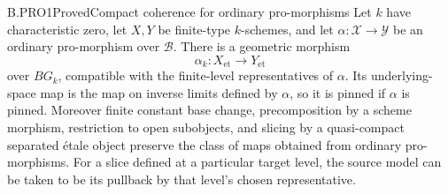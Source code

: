 \begin{claim}{B.PRO1}{Proved}{Compact coherence for ordinary pro-morphisms}
Let \(k\) have characteristic zero, let \(X,Y\) be finite-type
\(k\)-schemes, and let
\(\alpha:\mathcal X\to\mathcal Y\) be an ordinary pro-morphism
over \(\mathcal B\). There is a geometric morphism
\[
                 \alpha_k:X_{\mathrm{et}}\longrightarrow
                           Y_{\mathrm{et}}                 \tag{B.PRO.1}
\]
over \(BG_k\), compatible with the finite-level representatives of
\(\alpha\). Its underlying-space map is the map on inverse limits
defined by \(\alpha\), so it is pinned if \(\alpha\) is pinned.
Moreover finite constant base change, precomposition by a scheme
morphism, restriction to open subobjects, and slicing by a
quasi-compact separated étale object preserve the class of maps
obtained from ordinary pro-morphisms. For a slice defined at a
particular target level, the source model can be taken to be its
pullback by that level's chosen representative.
\end{claim}
